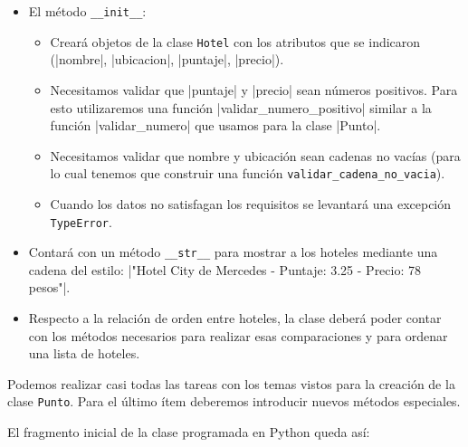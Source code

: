 \begin{itemize}
\item El método \lstinline+__init__+:

\begin{itemize}
\item Creará objetos de la clase \lstinline!Hotel! con los atributos que se
indicaron (|nombre|, |ubicacion|, |puntaje|, |precio|).

\item Necesitamos validar que |puntaje| y |precio| sean números positivos.
Para esto utilizaremos una función |validar_numero_positivo| similar a la
función |validar_numero| que usamos para la clase |Punto|.

\item Necesitamos validar que nombre y ubicación sean cadenas no vacías
(para lo cual tenemos que construir una función
\lstinline!validar_cadena_no_vacia!).

\item Cuando los datos no satisfagan los requisitos se levantará una
excepción \lstinline!TypeError!.
\end{itemize}

\item Contará con un método \lstinline+__str__+ para mostrar a los hoteles
mediante una cadena del estilo:
|"Hotel City de Mercedes - Puntaje: 3.25 - Precio: 78 pesos"|.

\item Respecto a la relación de orden entre hoteles, la clase deberá poder
contar con los métodos necesarios para realizar esas comparaciones y para
ordenar una lista de hoteles.
\end{itemize}

Podemos realizar casi todas las tareas con los temas vistos para la
creación de la clase \lstinline!Punto!.  Para el último ítem deberemos
introducir nuevos métodos especiales.


El fragmento inicial de la clase programada en Python queda así:

